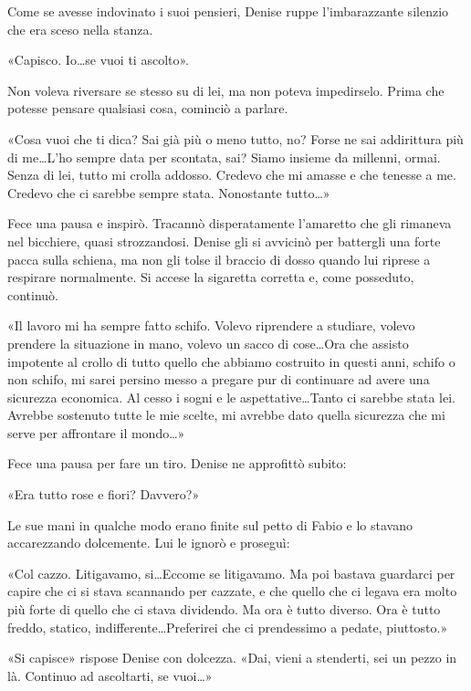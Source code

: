 Come se avesse indovinato i suoi pensieri, Denise ruppe l'imbarazzante silenzio che era sceso nella stanza.

«Capisco. Io\ldots se vuoi ti ascolto».

Non voleva riversare se stesso su di lei, ma non poteva impedirselo. Prima che potesse pensare qualsiasi cosa, cominciò a parlare.

«Cosa vuoi che ti dica? Sai già più o meno tutto, no? Forse ne sai addirittura più di me\ldots L'ho sempre data per scontata, sai? Siamo insieme da millenni, ormai. Senza di lei, tutto mi crolla addosso. Credevo che mi amasse e che tenesse a me. Credevo che ci sarebbe sempre stata. Nonostante tutto\ldots»

Fece una pausa e inspirò. Tracannò disperatamente l'amaretto che gli rimaneva nel bicchiere, quasi strozzandosi. Denise gli si avvicinò per battergli una forte pacca sulla schiena, ma non gli tolse il braccio di dosso quando lui riprese a respirare normalmente. Si accese la sigaretta corretta e, come posseduto, continuò.

«Il lavoro mi ha sempre fatto schifo. Volevo riprendere a studiare, volevo prendere la situazione in mano, volevo un sacco di cose\ldots Ora che assisto impotente al crollo di tutto quello che abbiamo costruito in questi anni, schifo o non schifo, mi sarei persino messo a pregare pur di continuare ad avere una sicurezza economica. Al cesso i sogni e le aspettative\ldots Tanto ci sarebbe stata lei. Avrebbe sostenuto tutte le mie scelte, mi avrebbe dato quella sicurezza che mi serve per affrontare il mondo\ldots»

Fece una pausa per fare un tiro. Denise ne approfittò subito:

«Era tutto rose e fiori? Davvero?»

Le sue mani in qualche modo erano finite sul petto di Fabio e lo stavano accarezzando dolcemente. Lui le ignorò e proseguì:

«Col cazzo. Litigavamo, si\ldots Eccome se litigavamo. Ma poi bastava guardarci per capire che ci si stava scannando per cazzate, e che quello che ci legava era molto più forte di quello che ci stava dividendo. Ma ora è tutto diverso. Ora è tutto freddo, statico, indifferente\ldots Preferirei che ci prendessimo a pedate, piuttosto.»

«Si capisce» rispose Denise con dolcezza. «Dai, vieni a stenderti, sei un pezzo in là. Continuo ad ascoltarti, se vuoi\ldots»

